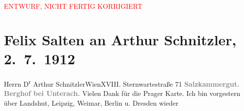 
\begin{center}
            \textcolor{red}{ENTWURF, NICHT FERTIG KORRIGIERT}
                      \end{center}
            
         
         \renewcommand{\erwaehntePersonen}{Personen: Paul Goldmann, Gerhart Hauptmann, Olga Schnitzler, Heinrich Schnitzler, Lili Schnitzler, Louise Wolff}
         \renewcommand{\erwaehnteOrte}{Orte: Berghof, Berlin, Brijuni, Dresden, Landshut, Leipzig, Prag, Sternwartestraße, Unterach am Attersee, Weimar, Wien}
         \renewcommand{\erwaehnteWerke}{Werke: Eine Gerhart Hauptmann-Première in Lauchstedt. (»Gabriel Schillings Flucht.«), Gabriel Schillings Flucht. Drama, Neue Freie Presse, Tagebuch}
               \section[Felix Salten an Arthur Schnitzler, 2. 7. 1912]{ Felix Salten an Arthur Schnitzler, 2. 7. 1912}\nopagebreak{}\rehead{ }\begin{ledgroupsized}[t]{13cm}\normalsize\beginnumbering \toendnotes[C]{\smallbreak\pagebreak[2]} 
\toendnotes[C]{\smallbreak}\pstart{}{\pb}Herrn D\textsuperscript{r} Arthur Schnitzler\pend{}\pstart{}Wien\pend{}\pstart{}XVIII. Sternwartestraße 71\pend{}{\bigskip}\pstart
           \noindent{}\centering{}{\pb}\textcolor{gray}{\textbf{Salzkammergut. Berghof bei
                        Unterach.}}\pend
           \pstart
           {\pb}Vielen Dank für die Prager Karte. Ich bin vorgestern über Landshut, Leipzig, Weimar, Berlin u. Dresden wieder

\end{ledgroupsized}
